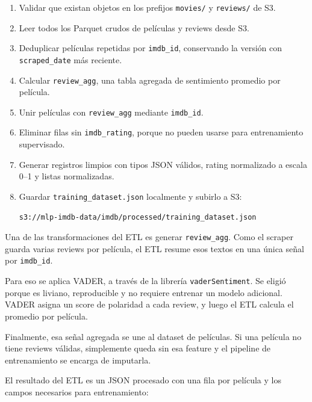 \documentclass[letterpaper,12pt]{article}
\begin{document}
\begin{enumerate}
    \item Validar que existan objetos en los prefijos \texttt{movies/} y \texttt{reviews/} de S3.
    \item Leer todos los Parquet crudos de películas y reviews desde S3.
    \item Deduplicar películas repetidas por \texttt{imdb\_id}, conservando la versión con \texttt{scraped\_date} más reciente.
    \item Calcular \texttt{review\_agg}, una tabla agregada de sentimiento promedio por película.
    \item Unir películas con \texttt{review\_agg} mediante \texttt{imdb\_id}.
    \item Eliminar filas sin \texttt{imdb\_rating}, porque no pueden usarse para entrenamiento supervisado.
    \item Generar registros limpios con tipos JSON válidos, rating normalizado a escala 0--1 y listas normalizadas.
    \item Guardar \texttt{training\_dataset.json} localmente y subirlo a S3:
    \begin{lstlisting}
s3://mlp-imdb-data/imdb/processed/training_dataset.json
    \end{lstlisting}
\end{enumerate}

Una de las transformaciones del ETL es generar \texttt{review\_agg}. Como el scraper guarda varias reviews por película, el ETL resume esos textos en una única señal por \texttt{imdb\_id}.

Para eso se aplica VADER, a través de la librería \texttt{vaderSentiment}. Se eligió porque es liviano, reproducible y no requiere entrenar un modelo adicional. VADER asigna un score de polaridad a cada review, y luego el ETL calcula el promedio por película.

Finalmente, esa señal agregada se une al dataset de películas. Si una película no tiene reviews válidas, simplemente queda sin esa feature y el pipeline de entrenamiento se encarga de imputarla.

El resultado del ETL es un JSON procesado con una fila por película y los campos necesarios para entrenamiento:
\end{document}
